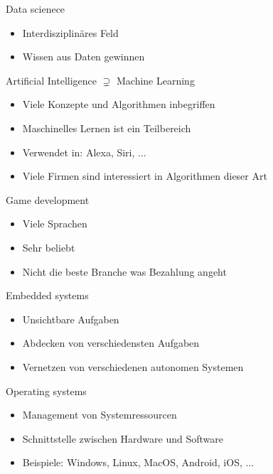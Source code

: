 \begin{frame}{Data scienece}
    \begin{itemize}
        \item Interdisziplinäres Feld
        \item Wissen aus Daten gewinnen
    \end{itemize}

    \note{

    }
\end{frame}

\begin{frame}{Artificial Intelligence $\supsetneq$ Machine Learning}
    \begin{itemize}
        \item Viele Konzepte und Algorithmen inbegriffen
        \item Maschinelles Lernen ist ein Teilbereich
        \item Verwendet in: Alexa, Siri, ...
        \item Viele Firmen sind interessiert in Algorithmen dieser Art
    \end{itemize}

    \note{

    }
\end{frame}

\begin{frame}{Game development}
    \begin{itemize}
        \item Viele Sprachen
        \item Sehr beliebt
        \item Nicht die beste Branche was Bezahlung angeht
    \end{itemize}

    \note{

    }
\end{frame}

\begin{frame}{Embedded systems}
    \begin{itemize}
        \item Unsichtbare Aufgaben
        \item Abdecken von verschiedensten Aufgaben
        \item Vernetzen von verschiedenen autonomen Systemen
    \end{itemize}

    \note{

    }
\end{frame}

\begin{frame}{Operating systems}
    \begin{itemize}
        \item Management von Systemressourcen
        \item Schnittstelle zwischen Hardware und Software
        \item Beispiele: Windows, Linux, MacOS, Android, iOS, ...
    \end{itemize}

    \note{

    }
\end{frame}